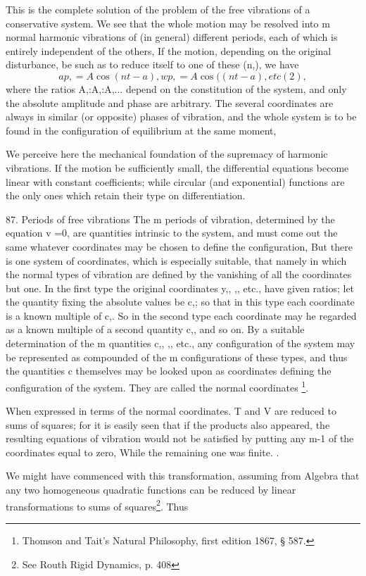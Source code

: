 This is the complete solution of the problem of the free vibrations of a
conservative system. We see that the whole motion may be resolved into m normal
harmonic vibrations of (in general) different periods, each of which is
entirely independent of the others, If the motion, depending on the original
disturbance, be such as to reduce itself to one of these (n,), we have
\[ap, =A \cos(nt-a), wp, =A \cos((nt-a), etc (2),\]
where the ratios A,:A,:A,... depend
on the constitution of the system, and only the absolute amplitude and phase
are arbitrary. The several coordinates are always in similar (or opposite)
phases of vibration, and the whole system is to be found in the configuration
of equilibrium at the same moment,

We perceive here the mechanical foundation of the supremacy of harmonic
vibrations. If the motion be sufficiently small, the differential equations
become linear with constant coefficients; while circular (and exponential)
functions are the only ones which retain their type on differentiation.

87.  Periods of free vibrations
The m periods of vibration, determined by the equation v =0, are quantities
intrinsic to the system, and must come out the same whatever coordinates may be
chosen to define the configuration, But there is one system of coordinates,
which is especially suitable, that namely in which the normal types of
vibration are defined by the vanishing of all the coordinates but one. In the
first type the original coordinates y,, ,, etc., have given ratios; let the
quantity fixing the absolute values be c,; so that in this type each coordinate
is a known multiple of c,.  So in the second type each coordinate may he
regarded as a known multiple of a second quantity c,, and so on. By a suitable
determination of the m quantities c,, ,, etc., any configuration of the system
may be represented as compounded of the m configurations of these types, and
thus the quantities c themselves may be looked upon as coordinates defining the
configuration of the system. They are called the normal coordinates
\footnote{Thomson and Tait's Natural Philosophy, first edition 1867, § 587.}.

When expressed in terms of the normal coordinates. T and V are reduced to sums
of squares; for it is easily seen that if the products also appeared, the
resulting equations of vibration would not be satisfied by putting any m-1 of
the coordinates equal to zero, While the remaining one was finite. .

We might have commenced with this transformation, assuming from Algebra that
any two homogeneous quadratic functions can be reduced by linear
transformations to sums of squares\footnote{See Routh Rigid Dynamics, p. 408}.
Thus

